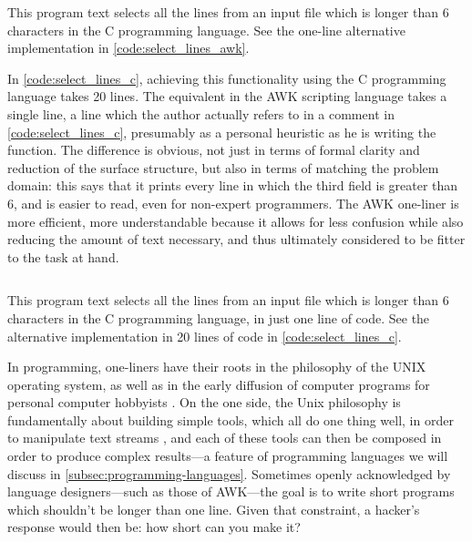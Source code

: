 \begin{listing}
  \inputminted{cpp}{./corpus/select_lines.c}
  \caption{This program text selects all the lines from an input file which is longer than 6 characters in the C programming language. See the one-line alternative implementation in \autoref{code:select_lines_awk}.}
  \label{code:select_lines_c}
\end{listing}

In \autoref{code:select_lines_c}, achieving this functionality  using the C programming language takes 20 lines. The equivalent in the AWK scripting language takes a single line, a line which the author actually refers to in a comment in \autoref{code:select_lines_c}, presumably as a personal heuristic as he is writing the function. The difference is obvious, not just in terms of formal clarity and reduction of the surface structure, but also in terms of matching the problem domain: this says that it prints every line in which the third field is greater than 6, and is easier to read, even for non-expert programmers. The AWK one-liner is more efficient, more understandable because it allows for less confusion while also reducing the amount of text necessary, and thus ultimately considered to be fitter to the task at hand.

\begin{listing}
  \inputminted{bash}{./corpus/select_lines.sh}
  \caption{This program text selects all the lines from an input file which is longer than 6 characters in the C programming language, in just one line of code. See the alternative implementation in 20 lines of code in \autoref{code:select_lines_c}.}
  \label{code:select_lines_awk}
\end{listing}

In programming, one-liners have their roots in the philosophy of the UNIX operating system, as well as in the early diffusion of computer programs for personal computer hobbyists \citep{montfort_10_2014}. On the one side, the Unix philosophy is fundamentally about building simple tools, which all do one thing well, in order to manipulate text streams \citep{raymond_art_2003}, and each of these tools can then be composed in order to produce complex results—a feature of programming languages we will discuss in \autoref{subsec:programming-languages}. Sometimes openly acknowledged by language designers—such as those of AWK—the goal is to write short programs which shouldn't be longer than one line. Given that constraint, a hacker's response would then be: how short can you make it?

